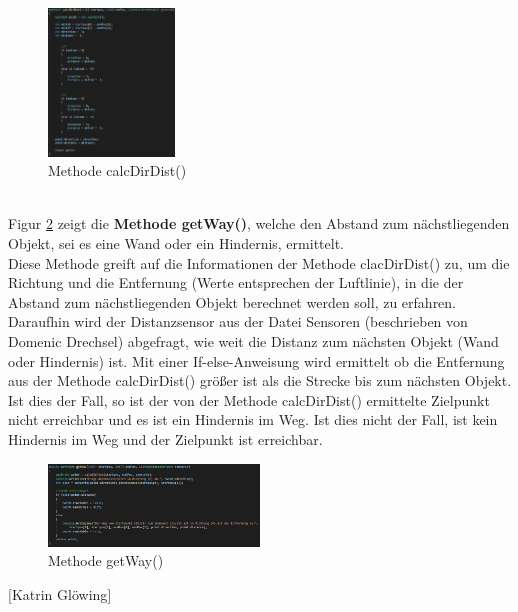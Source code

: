 \begin{figure}[htbp] 
  \centering
     \includegraphics[width=0.3\textwidth]{Bilder/calcDirDist.PNG}
  \caption{Methode calcDirDist()}
  \label{fig:calcdirdist}
\end{figure}\\
Figur \ref{fig:getway} zeigt die \textbf{Methode getWay()}, welche den Abstand zum nächstliegenden Objekt, sei es eine Wand oder ein Hindernis, ermittelt.\\
Diese Methode greift auf die Informationen der Methode clacDirDist() zu, um die Richtung und die Entfernung (Werte entsprechen der Luftlinie), in die der Abstand zum nächstliegenden Objekt berechnet werden soll, zu erfahren. Daraufhin wird der Distanzsensor aus der Datei Sensoren (beschrieben von Domenic Drechsel) abgefragt, wie weit die Distanz zum nächsten Objekt (Wand oder Hindernis) ist. Mit einer If-else-Anweisung wird ermittelt ob die Entfernung aus der Methode calcDirDist() größer ist als die Strecke bis zum nächsten Objekt. Ist dies der Fall, so ist der von der Methode calcDirDist() ermittelte Zielpunkt nicht erreichbar und es ist ein Hindernis im Weg. Ist dies nicht der Fall, ist kein Hindernis im Weg und der Zielpunkt ist erreichbar.
\begin{figure}[htbp] 
  \centering
     \includegraphics[width=0.5\textwidth]{Bilder/getWay.PNG}
  \caption{Methode getWay()}
  \label{fig:getway}
\end{figure}
\begin{flushright}
	$ [ $Katrin Glöwing$ ] $
\end{flushright}